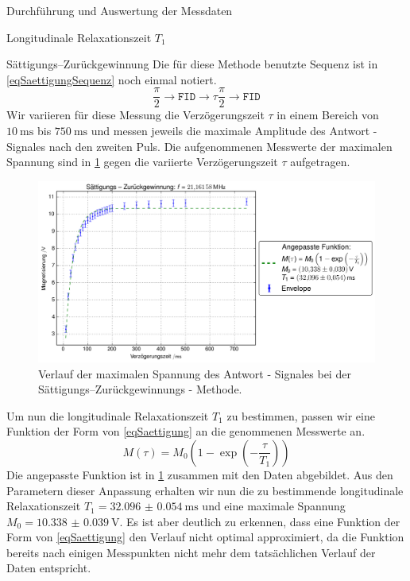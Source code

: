 \documentclass[pdftex, a4paper,11pt, twoside, ngerman]{report}
\begin{document}
\begin{chapter}{Durchführung und Auswertung der Messdaten}
\begin{section}{
        Longitudinale Relaxationszeit $T_{1}$}
\begin{subsection}{Sättigungs--Zurückgewinnung}
        Die für diese Methode benutzte Sequenz ist in \cref{eqSaettigungSequenz}
        noch einmal notiert.
        \begin{equation}
          \label{eqSaettigungSequenz}
          \frac{\pi}{2} \rightarrow \mathtt{FID} \rightarrow
          \tau \frac{\pi}{2} \rightarrow \mathtt{FID}
        \end{equation}
        Wir variieren für diese Messung die Verzögerungszeit $\tau$ in einem
        Bereich von $\SI{10}{\milli\second}$ bis $\SI{750}{\milli\second}$
        und messen jeweils die maximale Amplitude des Antwort - Signales nach
        den zweiten Puls.
        Die aufgenommenen Messwerte der maximalen Spannung sind in
        \cref{figSaettigung} gegen die variierte Verzögerungszeit $\tau$
        aufgetragen.
        \begin{figure}[htb]
          \centering
          \includegraphics[width=\textwidth]
          {Figures/SaettigungsZurueckgewinnung.png}
          \caption{Verlauf der maximalen Spannung des Antwort - Signales bei der
            Sättigungs--Zurückgewinnungs - Methode.}
          \label{figSaettigung}
        \end{figure}
        
        Um nun die longitudinale Relaxationszeit $T_{1}$ zu bestimmen,
        passen wir eine Funktion der Form von \cref{eqSaettigung} an die
        genommenen Messwerte an.
        \begin{equation}
          \label{eqSaettigung}
          M(\tau)=M_{0}\left(1-\exp\left(-\frac{\tau}{T_{1}}\right)\right)
        \end{equation} 
        Die angepasste Funktion ist in \cref{figSaettigung} zusammen mit den
        Daten abgebildet.
        Aus den Parametern dieser Anpassung erhalten wir nun die zu bestimmende
        longitudinale Relaxationszeit $T_{1}=\SI{32.096(54)}{\milli\second}$
        und eine maximale Spannung $M_{0}=\SI{10.338(39)}{\volt}$.
        Es ist aber deutlich zu erkennen, dass eine Funktion der Form von
        \cref{eqSaettigung} den Verlauf nicht optimal approximiert, da die
        Funktion bereits nach einigen Messpunkten nicht mehr dem tatsächlichen
        Verlauf der Daten entspricht.
        

\end{subsection}
\end{section}
\end{chapter}
\end{document}
